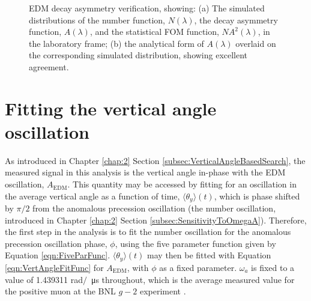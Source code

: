 \begin{figure}[t!]
\centering{}
\caption{EDM decay asymmetry verification, showing: (a) The simulated distributions of the number function, $N(\lambda)$, the decay asymmetry function, $A(\lambda)$, and the statistical FOM function, $NA^{2}(\lambda)$, in the laboratory frame; (b) the analytical form of $A(\lambda)$ overlaid on the corresponding simulated distribution, showing excellent agreement.}
\label{fig:SimAsymmetry_EDM}
\end{figure} 

\section{Fitting the vertical angle oscillation}\label{sec:FittingThetaYSim}

As introduced in Chapter \ref{chap:2} Section \ref{subsec:VerticalAngleBasedSearch}, the measured signal in this analysis is the vertical angle in-phase with the EDM oscillation, $A_{\text{EDM}}$. This quantity may be accessed by fitting for an oscillation in the average vertical angle as a function of time, $\langle \theta_{y} \rangle(t)$, which is phase shifted by $\pi/2$ from the anomalous precession oscillation (the number oscillation, introduced in Chapter \ref{chap:2} Section \ref{subsec:SensitivityToOmegaA}). Therefore, the first step in the analysis is to fit the number oscillation for the anomalous precession oscillation phase, $\phi$, using the five parameter function given by Equation \ref{eqn:FiveParFunc}. $\langle \theta_{y} \rangle(t)$ may then be fitted with Equation \ref{eqn:VertAngleFitFunc} for $A_{\text{EDM}}$, with $\phi$ as a fixed parameter. $\omega_{a}$ is fixed to a value of 1.439311 rad$/$\SI{}{\micro\second} throughout, which is the average measured value for the positive muon at the BNL $g-2$ experiment \cite{BNLFinalReport}.

